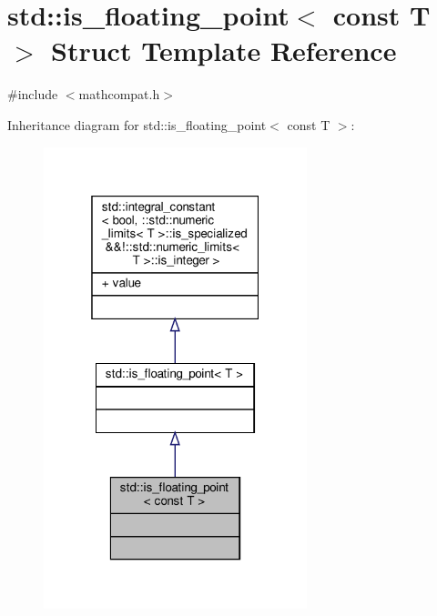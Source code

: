 \hypertarget{structstd_1_1is__floating__point_3_01const_01T_01_4}{}\section{std\+:\+:is\+\_\+floating\+\_\+point$<$ const T $>$ Struct Template Reference}
\label{structstd_1_1is__floating__point_3_01const_01T_01_4}


{\ttfamily \#include $<$mathcompat.\+h$>$}



Inheritance diagram for std\+:\+:is\+\_\+floating\+\_\+point$<$ const T $>$\+:\nopagebreak
\begin{figure}[H]
\begin{center}
\leavevmode
\includegraphics[width=217pt]{de/d2a/structstd_1_1is__floating__point_3_01const_01T_01_4__inherit__graph}
\end{center}
\end{figure}


